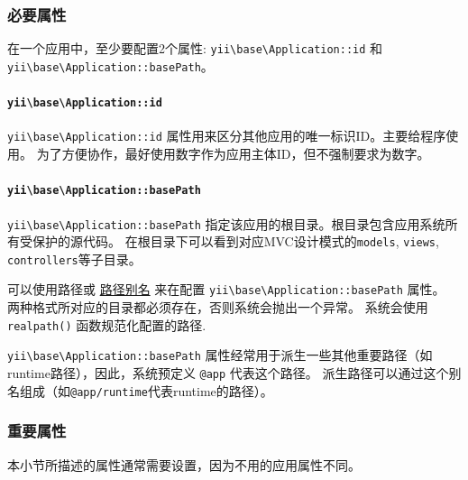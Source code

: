 \subsubsection{必要属性 \label{structure-applications.md::required-properties}}
在一个应用中，至少要配置2个属性: \texttt{yii{\allowbreak{}\textbackslash}base{\allowbreak{}\textbackslash}Application\allowbreak{}::\allowbreak{}id} 和 \texttt{yii{\allowbreak{}\textbackslash}base{\allowbreak{}\textbackslash}Application\allowbreak{}::\allowbreak{}basePath}。

\paragraph{\texttt{yii{\allowbreak{}\textbackslash}base{\allowbreak{}\textbackslash}Application\allowbreak{}::\allowbreak{}id} \label{structure-applications.md::id}}
\texttt{yii{\allowbreak{}\textbackslash}base{\allowbreak{}\textbackslash}Application\allowbreak{}::\allowbreak{}id} 属性用来区分其他应用的唯一标识ID。主要给程序使用。
为了方便协作，最好使用数字作为应用主体ID，但不强制要求为数字。

\paragraph{\texttt{yii{\allowbreak{}\textbackslash}base{\allowbreak{}\textbackslash}Application\allowbreak{}::\allowbreak{}basePath} \label{structure-applications.md::basePath}}
\texttt{yii{\allowbreak{}\textbackslash}base{\allowbreak{}\textbackslash}Application\allowbreak{}::\allowbreak{}basePath} 指定该应用的根目录。根目录包含应用系统所有受保护的源代码。
在根目录下可以看到对应MVC设计模式的\lstinline|models|, \lstinline|views|, \lstinline|controllers|等子目录。

可以使用路径或 \hyperref[concept-aliases.md]{路径别名} 来在配置 \texttt{yii{\allowbreak{}\textbackslash}base{\allowbreak{}\textbackslash}Application\allowbreak{}::\allowbreak{}basePath} 属性。
两种格式所对应的目录都必须存在，否则系统会抛出一个异常。 系统会使用 \lstinline|realpath()| 函数规范化配置的路径.

\texttt{yii{\allowbreak{}\textbackslash}base{\allowbreak{}\textbackslash}Application\allowbreak{}::\allowbreak{}basePath} 属性经常用于派生一些其他重要路径（如runtime路径），因此，系统预定义 \lstinline|@app| 代表这个路径。
派生路径可以通过这个别名组成（如\lstinline|@app/runtime|代表runtime的路径）。

\subsubsection{重要属性 \label{structure-applications.md::important-properties}}
本小节所描述的属性通常需要设置，因为不用的应用属性不同。

